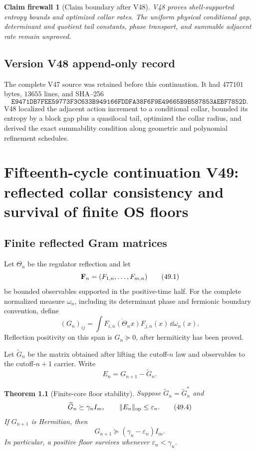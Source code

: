 \documentclass[11pt]{article}
\newtheorem{theorem}{Theorem}[section]
\newtheorem{firewall}[theorem]{Claim firewall}
\theoremstyle{remark}
\begin{document}
\begin{firewall}[Claim boundary after V48]
\label{fire:v15v48}
V48 proves shell-supported entropy bounds and optimized collar
rates.  The uniform physical conditional gap, determinant and
quotient tail constants, phase transport, and summable adjacent
rate remain unproved.
\end{firewall}

\section*{Version V48 append-only record}
The complete V47 source was retained before this continuation.  It
had \(477101\) bytes, \(13655\) lines, and SHA--256
\[
 \texttt{E9471DB7FEE59773F3C633B949166FDDFA38F6F9E49665B9B587853AEBF7852D}.
\]
V48 localized the adjacent action increment to a conditional
collar, bounded its entropy by a block gap plus a quasilocal tail,
optimized the collar radius, and derived the exact summability
condition along geometric and polynomial refinement schedules.

\chapter{Fifteenth-cycle continuation V49: reflected collar consistency and survival of finite OS floors}
\label{sec:v15v49}

\section{Finite reflected Gram matrices}

Let \(\Theta_n\) be the regulator reflection and let
\[
 {\bf F}_n=(F_{1,n},\ldots,F_{m,n})                     \tag{49.1}
\]
be bounded observables supported in the positive-time half.  For
the complete normalized measure \(\omega_n\), including its
determinant phase and fermionic boundary convention, define
\[
 (G_n)_{ij}=
 \int\overline{F_{i,n}(\Theta_nx)}F_{j,n}(x)\,
       \dd\omega_n(x).                                  \tag{49.2}
\]
Reflection positivity on this span is \(G_n\succeq0\), after
hermiticity has been proved.

Let \(\widetilde G_n\) be the matrix obtained after lifting the
cutoff-\(n\) law and observables to the cutoff-\(n+1\) carrier.
Write
\[
 E_n=G_{n+1}-\widetilde G_n.                            \tag{49.3}
\]

\begin{theorem}[Finite-core floor stability]
\label{thm:v15v49-floor}
Suppose \(\widetilde G_n=\widetilde G_n^*\) and
\[
 \widetilde G_n\succeq\gamma_nI_m,\qquad
 \|E_n\|_{\rm op}\leq\varepsilon_n.                     \tag{49.4}
\]
If \(G_{n+1}\) is Hermitian, then
\[
 \boxed{G_{n+1}\succeq(\gamma_n-\varepsilon_n)I_m.}     \tag{49.5}
\]
In particular, a positive floor survives whenever
\(\varepsilon_n<\gamma_n\).
\end{theorem}
\end{document}
